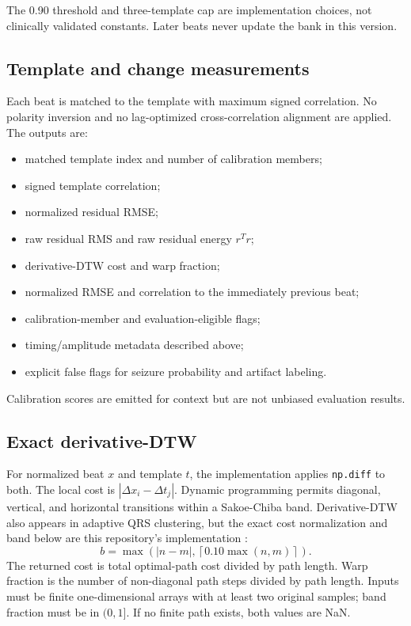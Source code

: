 \documentclass[11pt,a4paper]{article}
\begin{document}
The 0.90 threshold and three-template cap are implementation choices, not clinically validated constants. Later beats never update the bank in this version.

\subsection{Template and change measurements}

Each beat is matched to the template with maximum signed correlation. No polarity inversion and no lag-optimized cross-correlation alignment are applied. The outputs are:

\begin{itemize}
  \item matched template index and number of calibration members;
  \item signed template correlation;
  \item normalized residual RMSE;
  \item raw residual RMS and raw residual energy $r^Tr$;
  \item derivative-DTW cost and warp fraction;
  \item normalized RMSE and correlation to the immediately previous beat;
  \item calibration-member and evaluation-eligible flags;
  \item timing/amplitude metadata described above;
  \item explicit false flags for seizure probability and artifact labeling.
\end{itemize}

Calibration scores are emitted for context but are not unbiased evaluation results.

\subsection{Exact derivative-DTW}

For normalized beat $x$ and template $t$, the implementation applies \texttt{np.diff} to both. The local cost is $|\Delta x_i-\Delta t_j|$. Dynamic programming permits diagonal, vertical, and horizontal transitions within a Sakoe-Chiba band. Derivative-DTW also appears in adaptive QRS clustering, but the exact cost normalization and band below are this repository's implementation \cite{adaptiveqrs}:
\[
b=\max\left(|n-m|,\left\lceil0.10\max(n,m)\right\rceil\right).
\]
The returned cost is total optimal-path cost divided by path length. Warp fraction is the number of non-diagonal path steps divided by path length. Inputs must be finite one-dimensional arrays with at least two original samples; band fraction must be in $(0,1]$. If no finite path exists, both values are NaN.
\end{document}

